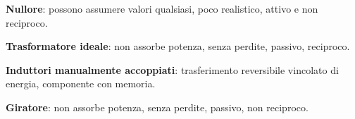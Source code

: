 \textbf{Nullore}: possono assumere valori qualsiasi, poco realistico, attivo e non reciproco.

\textbf{Trasformatore ideale}: non assorbe potenza, senza perdite, passivo, reciproco.

\textbf{Induttori manualmente accoppiati}: trasferimento reversibile vincolato di energia, componente con memoria.

\textbf{Giratore}: non assorbe potenza, senza perdite, passivo, non reciproco.
